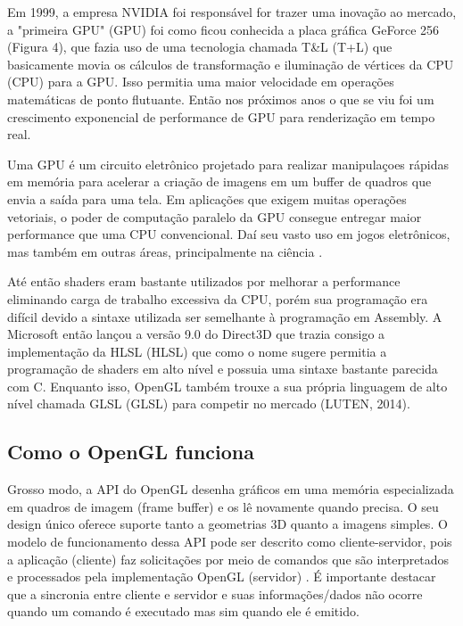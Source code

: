 Em 1999, a empresa NVIDIA foi responsável for trazer uma inovação ao mercado, a "primeira GPU"  (\acrlong{GPU}) foi como ficou conhecida a placa gráfica GeForce 256 (Figura 4), que fazia uso de uma tecnologia chamada T\&L (\acrlong{T+L}) que basicamente movia os cálculos de transformação e iluminação de vértices da CPU (\acrlong{CPU}) para a \acrshort{GPU}. Isso permitia uma maior velocidade em operações matemáticas de ponto flutuante. Então nos próximos anos o que se viu foi um crescimento exponencial de performance de \acrshort{GPU} para renderização em tempo real.

Uma GPU é um circuito eletrônico projetado para realizar manipulaçoes rápidas em memória para acelerar a criação de imagens em um buffer de quadros que envia a saída para uma tela. Em aplicações que exigem muitas operações vetoriais, o poder de computação paralelo da GPU consegue entregar maior performance que uma CPU convencional. Daí seu vasto uso em jogos eletrônicos, mas também em outras áreas, principalmente na ciência \cite{shea2013gpu}.

Até então shaders eram bastante utilizados por melhorar a performance eliminando carga de trabalho excessiva da \acrshort{CPU}, porém sua programação era difícil devido a sintaxe utilizada ser semelhante à programação em Assembly. A Microsoft então lançou a versão 9.0 do Direct3D que trazia consigo a implementação da HLSL (\acrlong{HLSL}) que como o nome sugere permitia a programação de shaders em alto nível e possuia uma sintaxe bastante parecida com C. Enquanto isso, OpenGL também trouxe a sua própria linguagem de alto nível chamada GLSL (\acrlong{GLSL}) para competir no mercado (LUTEN, 2014)\nocite{openGLBook}. 

\subsection{Como o OpenGL funciona}
\label{sec:como-opengl-funciona}

Grosso modo, a API do OpenGL desenha gráficos em uma memória especializada em quadros de imagem (frame buffer) e os lê novamente quando precisa. O seu design único oferece suporte tanto a geometrias 3D quanto a imagens simples. O modelo de funcionamento dessa API pode ser descrito como cliente-servidor, pois a aplicação (cliente) faz solicitações por meio de comandos que são interpretados e processados pela implementação OpenGL (servidor) \cite{GLSLBook}. É importante destacar que a sincronia entre cliente e servidor e suas informações/dados não ocorre quando um comando é executado mas sim quando ele é emitido.

